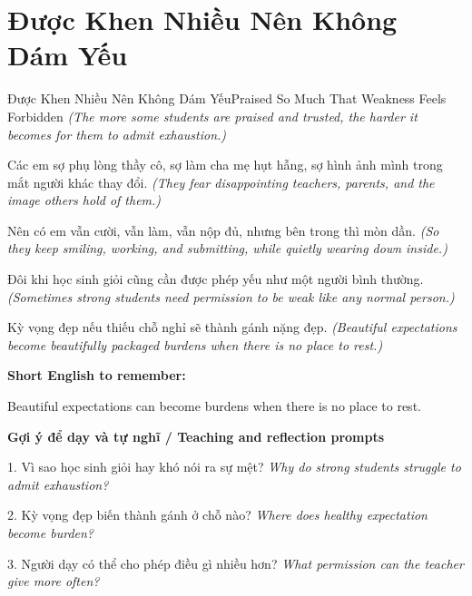 \section{Được Khen Nhiều Nên Không Dám Yếu}
\begin{truyen}{Được Khen Nhiều Nên Không Dám Yếu}{Praised So Much That Weakness Feels Forbidden}
\textit{(The more some students are praised and trusted, the harder it becomes for them to admit exhaustion.)}

Các em sợ phụ lòng thầy cô, sợ làm cha mẹ hụt hẫng, sợ hình ảnh mình trong mắt người khác thay đổi.
\textit{(They fear disappointing teachers, parents, and the image others hold of them.)}

Nên có em vẫn cười, vẫn làm, vẫn nộp đủ, nhưng bên trong thì mòn dần.
\textit{(So they keep smiling, working, and submitting, while quietly wearing down inside.)}

Đôi khi học sinh giỏi cũng cần được phép yếu như một người bình thường.
\textit{(Sometimes strong students need permission to be weak like any normal person.)}

\end{truyen}

\begin{baihoc}
Kỳ vọng đẹp nếu thiếu chỗ nghỉ sẽ thành gánh nặng đẹp.
\textit{(Beautiful expectations become beautifully packaged burdens when there is no place to rest.)}
\end{baihoc}

\begin{ghinhoanh}
\textbf{Short English to remember:}

Beautiful expectations can become burdens when there is no place to rest.

\end{ghinhoanh}

\begin{tuhocnhanh}
\textbf{Gợi ý để dạy và tự nghĩ / Teaching and reflection prompts}

1. Vì sao học sinh giỏi hay khó nói ra sự mệt? \textit{Why do strong students struggle to admit exhaustion?}

2. Kỳ vọng đẹp biến thành gánh ở chỗ nào? \textit{Where does healthy expectation become burden?}

3. Người dạy có thể cho phép điều gì nhiều hơn? \textit{What permission can the teacher give more often?}
\end{tuhocnhanh}
\ngancach

